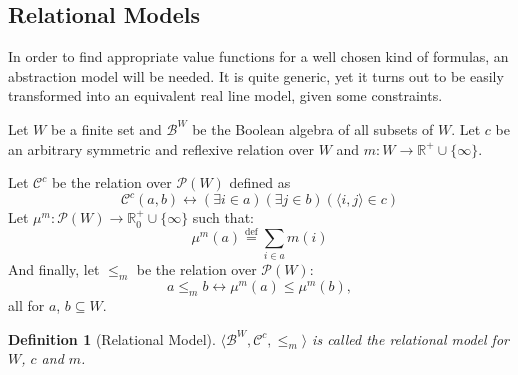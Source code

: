 \documentclass{article}
\newtheorem*{definition}{Definition}
\newcommand{\R}{\mathbb{R}}
\newcommand{\pwrset}{\mathcal{P}}
\newcommand{\B}{\mathcal{B}}
\newcommand{\eqdef}{\stackrel{\text{def}}{=}}
\begin{document}
\subsection{Relational Models}
In order to find appropriate value functions for a well chosen kind of formulas, an abstraction model will be needed. It is quite generic, yet it turns out to be easily transformed into an equivalent real line model, given some constraints.

Let $W$ be a finite set and $\B^W$ be the Boolean algebra of all subsets of $W$. Let $c$ be an arbitrary symmetric and reflexive relation over $W$ and $m: W \rightarrow \R^+ \cup \{\infty\}$.

Let $\mathcal{C}^c$ be the relation over $\pwrset(W)$ defined as
\begin{equation*}
  \mathcal{C}^c(a, b) \leftrightarrow (\exists i \in a)(\exists j \in b)(\langle i, j \rangle \in c)
\end{equation*}
Let $\mu^m: \pwrset(W) \rightarrow \R_0^+ \cup \{\infty\}$ such that:
\begin{equation*}
  \mu^m(a) \eqdef \sum_{i \in a}m(i)
\end{equation*}
And finally, let $\leq_m$ be the relation over $\pwrset(W)$:
\begin{equation*}
  a \leq_m b \leftrightarrow \mu^m(a) \leq \mu^m(b),
\end{equation*}
all for $a$, $b \subseteq W$.
\begin{definition}[Relational Model]
$\langle \B^W, \mathcal{C}^c, \leq_m \rangle$ is called the \emph{relational model for $W$, $c$ and $m$}.
\end{definition}
\end{document}
